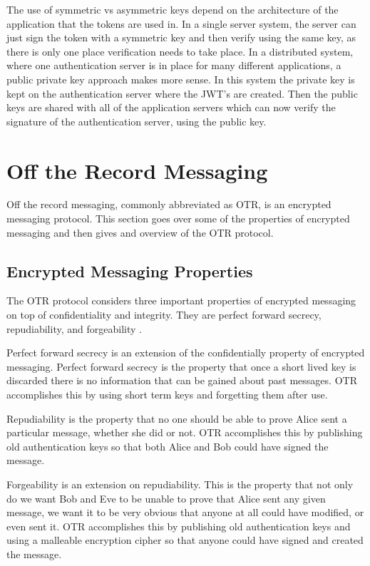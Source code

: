 The use of symmetric vs asymmetric keys depend on the architecture of the application that the tokens are used in. In a single server system, the server can just sign the token with a symmetric key and then verify using the same key, as there is only one place verification needs to take place. In a distributed system, where one authentication server is in place for many different applications, a public private key approach makes more sense. In this system the private key is kept on the authentication server where the JWT's are created. Then the public keys are shared with all of the application servers which can now verify the signature of the authentication server, using the public key.


\section{Off the Record Messaging}


Off the record messaging, commonly abbreviated as OTR, is an encrypted messaging protocol. This section goes over some of the properties of encrypted messaging and then gives and overview of the OTR protocol.


\subsection{Encrypted Messaging Properties}


The OTR protocol considers three important properties of encrypted messaging on top of confidentiality and integrity. They are perfect forward secrecy, repudiability, and forgeability \cite{otr-paper}.


Perfect forward secrecy is an extension of the confidentially property of encrypted messaging. Perfect forward secrecy is the property that once a short lived key is discarded there is no information that can be gained about past messages. OTR accomplishes this by using short term keys and forgetting them after use. 


Repudiability is the property that no one should be able to prove Alice sent a particular message, whether she did or not. OTR accomplishes this by publishing old authentication keys so that both Alice and Bob could have signed the message.


Forgeability is an extension on repudiability. This is the property that not only do we want Bob and Eve to be unable to prove that Alice sent any given message, we want it to be very obvious that anyone at all could have modified, or even sent it. OTR accomplishes this by publishing old authentication keys and using a malleable encryption cipher so that anyone could have signed and created the message.


